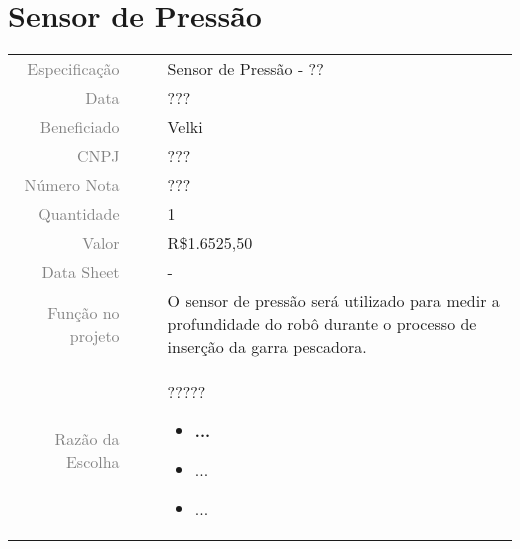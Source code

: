 

\section{Sensor de Pressão}
\label{pressao}


\begin{table}[ht!]

	\begin{tabular}{r l|l p{12cm} }
		
		\textcolor{gray}{Especificação} &&& 	{Sensor de Pressão - ??}\\
		\textcolor{gray}{Data} &&& 				{???}\\
        \textcolor{gray}{Beneficiado} &&&		{Velki} \\
        \textcolor{gray}{CNPJ} &&& 				{???} \\
        \textcolor{gray}{Número Nota} &&& 		{???} \\
		\textcolor{gray}{Quantidade} &&& 		{1} \\
		\textcolor{gray}{Valor} &&& 			{R\$1.6525,50} \\
		\textcolor{gray}{Data Sheet} &&& 		{-} \\

		\textcolor{gray}{Função no projeto} &&& {O sensor de pressão será utilizado para medir a profundidade do robô durante o processo de inserção da garra pescadora.} \\
		\textcolor{gray}{Razão da Escolha} &&& {   ?????   

		\begin{itemize}
		  \item \textbf{...} 
		  \item ...
		  \item ...
		\end{itemize}}
		

	\end{tabular}
\end{table}

